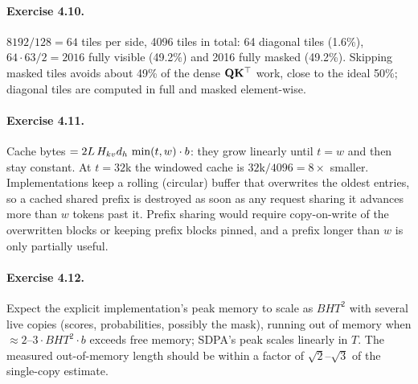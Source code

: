 \paragraph{Exercise 4.10.} $8192/128=64$ tiles per side, 4096 tiles in total: 64 diagonal tiles (1.6\%),
$64\cdot63/2=2016$ fully visible (49.2\%) and 2016 fully masked (49.2\%). Skipping masked tiles avoids
about 49\% of the dense $\mathbf{Q}\mathbf{K}^\top$ work, close to the ideal 50\%; diagonal tiles are
computed in full and masked element-wise.

\paragraph{Exercise 4.11.} Cache bytes $=2L\,H_{kv}d_{h}\,\min(t,w)\cdot b$: they grow linearly until
$t=w$ and then stay constant. At $t=32$k the windowed cache is $32\text{k}/4096=8\times$ smaller.
Implementations keep a rolling (circular) buffer that overwrites the oldest entries, so a cached
shared prefix is destroyed as soon as any request sharing it advances more than $w$ tokens past it.
Prefix sharing would require copy-on-write of the overwritten blocks or keeping prefix blocks pinned,
and a prefix longer than $w$ is only partially useful.

\paragraph{Exercise 4.12.} Expect the explicit implementation's peak memory to scale as $BHT^2$ with
several live copies (scores, probabilities, possibly the mask), running out of memory when
$\approx 2$--$3\cdot BHT^2\cdot b$ exceeds free memory; SDPA's peak scales linearly in $T$.
The measured out-of-memory length should be within a factor of $\sqrt{2}$--$\sqrt{3}$ of the
single-copy estimate.
